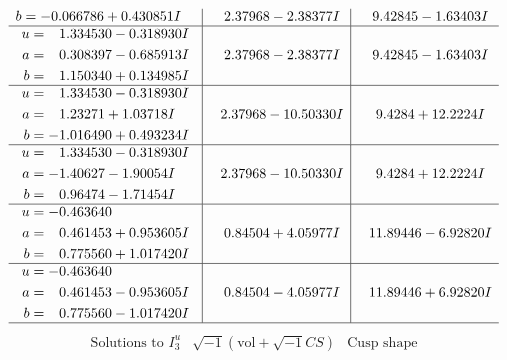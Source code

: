 \documentclass[1p]{elsarticle_modified}
\theoremstyle{definition}
\newcommand{\I}{\sqrt{-1}}
\begin{document}
$$\begin{array}{c|c|c}
\begin{aligned}
b &= -0.066786 + 0.430851 I\end{aligned}
 & \phantom{-}2.37968 - 2.38377 I & \phantom{-}9.42845 - 1.63403 I \\ \hline\begin{aligned}
u &= \phantom{-}1.334530 - 0.318930 I \\
a &= \phantom{-}0.308397 - 0.685913 I \\
b &= \phantom{-}1.150340 + 0.134985 I\end{aligned}
 & \phantom{-}2.37968 - 2.38377 I & \phantom{-}9.42845 - 1.63403 I \\ \hline\begin{aligned}
u &= \phantom{-}1.334530 - 0.318930 I \\
a &= \phantom{-}1.23271 + 1.03718 I \\
b &= -1.016490 + 0.493234 I\end{aligned}
 & \phantom{-}2.37968 - 10.50330 I & \phantom{-}9.4284 + 12.2224 I \\ \hline\begin{aligned}
u &= \phantom{-}1.334530 - 0.318930 I \\
a &= -1.40627 - 1.90054 I \\
b &= \phantom{-}0.96474 - 1.71454 I\end{aligned}
 & \phantom{-}2.37968 - 10.50330 I & \phantom{-}9.4284 + 12.2224 I \\ \hline\begin{aligned}
u &= -0.463640\phantom{ +0.000000I} \\
a &= \phantom{-}0.461453 + 0.953605 I \\
b &= \phantom{-}0.775560 + 1.017420 I\end{aligned}
 & \phantom{-}0.84504 + 4.05977 I & \phantom{-}11.89446 - 6.92820 I \\ \hline\begin{aligned}
u &= -0.463640\phantom{ +0.000000I} \\
a &= \phantom{-}0.461453 - 0.953605 I \\
b &= \phantom{-}0.775560 - 1.017420 I\end{aligned}
 & \phantom{-}0.84504 - 4.05977 I & \phantom{-}11.89446 + 6.92820 I\\
 \hline 
 \end{array}$$\newpage$$\begin{array}{c|c|c}  
\text{Solutions to }I^u_{3}& \I (\text{vol} + \sqrt{-1}CS) & \text{Cusp shape}\\
 \hline 
\begin{aligned}

\end{aligned}
\end{array}$$
\end{document}
